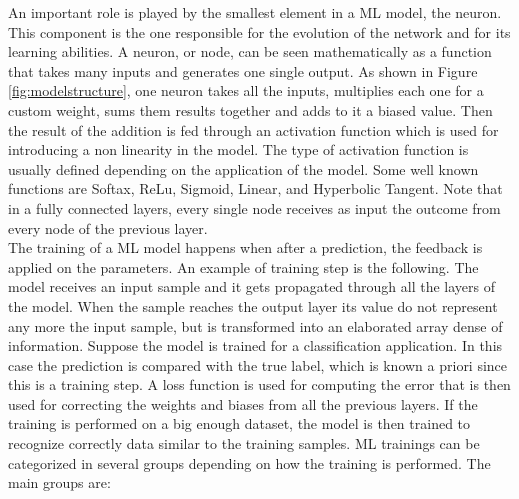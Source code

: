 \documentclass[12pt]{report}
\begin{document}
An important role is played by the smallest element in a ML model, the neuron. This component is the one responsible for the evolution of the network and for its learning abilities. A neuron, or node, can be seen mathematically as a function that takes many inputs and generates one single output. As shown in Figure \ref{fig:modelstructure}, one neuron takes all the inputs, multiplies each one for a custom weight, sums them results together and adds to it a biased value. Then the result of the addition is fed through an activation function which is used for introducing a non linearity in the model. The type of activation function is usually defined depending on the application of the model. Some well known functions are Softax, ReLu, Sigmoid, Linear, and Hyperbolic Tangent. Note that in a fully connected layers, every single node receives as input the outcome from every node of the previous layer. \\
The training of a ML model happens when after a prediction, the feedback is applied on the parameters. An example of training step is the following. The model receives an input sample and it gets propagated through all the layers of the model. When the sample reaches the output layer its value do not represent any more the input sample, but is transformed into an elaborated array dense of information. Suppose the model is trained for a classification application. In this case the prediction is compared with the true label, which is known a priori since this is a training step. A loss function is used for computing the error that is then used for correcting the weights and biases from all the previous layers. If the training is performed on a big enough dataset, the model is then trained to recognize correctly data similar to the training samples.
ML trainings can be categorized in several groups depending on how the training is performed. The main groups are:
\end{document}
